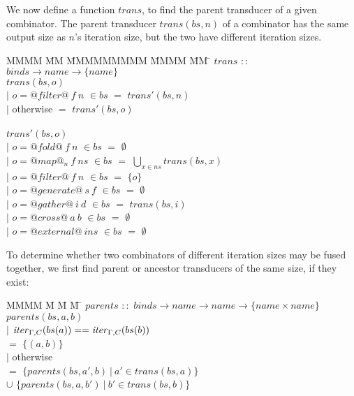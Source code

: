 We now define a function $trans$, to find the parent transducer of a given combinator.
The parent transducer $trans(bs, n)$ of a combinator has the same output size as $n$'s iteration size, but the two have different iteration sizes.

\begin{tabbing}
MMMM \= MM \= MMMMMMMMM \= MMMM \= MM \= \kill
$trans$  \>$::$\> $binds \rightarrow name \rightarrow \{name\}$ \\
$trans(bs,o)$    \\
            \> $|$ \> $o = @filter@~f~n$    \> $\in bs$ \> $=$ \> $trans'(bs,n)$ \\
            \> $|$ \> otherwise             \>          \> $=$ \> $trans'(bs,o)$ \\
\\
$trans'(bs,o)$    \\
            \> $|$ \> $o = @fold@~f~n$      \> $\in bs$ \> $=$ \> $\emptyset$ \\
            \> $|$ \> $o = @map@_n~f~ns$    \> $\in bs$ \> $=$ \> $\bigcup_{x \in ns} trans(bs, x)$ \\
            \> $|$ \> $o = @filter@~f~n$    \> $\in bs$ \> $=$ \> $\{o\}$       \\
            \> $|$ \> $o = @generate@~s~f$  \> $\in bs$ \> $=$ \> $\emptyset$ \\
            \> $|$ \> $o = @gather@~i~d$    \> $\in bs$ \> $=$ \> $trans(bs,i)$ \\
            \> $|$ \> $o = @cross@~a~b$     \> $\in bs$ \> $=$ \> $\emptyset$ \\
            \> $|$ \> $o = @external@~ins$  \> $\in bs$ \> $=$ \> $\emptyset$ \\
\end{tabbing}

To determine whether two combinators of different iteration sizes may be fused together, we first find parent or ancestor transducers of the same size, if they exist:
\begin{tabbing}
MMMM \= M \= M \= M \= \kill
$parents$ \> $::$ \> $binds \to name \to name \to \{name \times name\}$ \\
$parents(bs, a, b)$ \\
        \> $|$ \> $\mathit{iter}_{\Gamma,C}(bs(a)) == \mathit{iter}_{\Gamma,C}(bs(b))$ \\
        \>     \>                      \> $=$ \> $\{(a, b)\}$ \\
        \> $|$ \> otherwise            \\
        \>     \>                      \> $=$    \> $\{ parents(bs, a', b) ~|~ a' \in trans(bs, a) \} $      \\
        \>     \>                      \> $\cup$ \> $\{ parents(bs, a, b') ~|~ b' \in trans(bs, b) \} $  \\
\end{tabbing}

